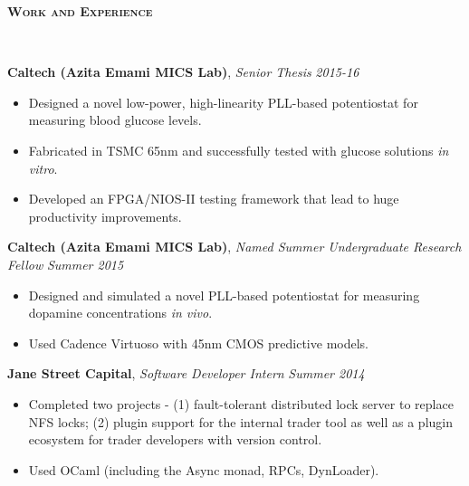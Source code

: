 \documentclass{article}
\newenvironment{changemargin}[2]{%
  \begin{list}{}{%
    \setlength{\topsep}{0pt}%
    \setlength{\leftmargin}{#1}%
    \setlength{\rightmargin}{#2}%
    \setlength{\listparindent}{\parindent}%
    \setlength{\itemindent}{\parindent}%
    \setlength{\parsep}{\parskip}%
  }%
  \item[]}{\end{list}
}
\newcommand{\lineover}{
	\begin{changemargin}{-0.05in}{-0.05in}
		\vspace*{-8pt}
		\hrulefill \\
		\vspace*{-2pt}
	\end{changemargin}
}
\newcommand{\header}[1]{
	\begin{changemargin}{-.5in}{-0.5in}
		{\large \textbf{\scshape{#1}}}\\
  	\lineover
	\end{changemargin}
}
\newenvironment{body} {
	\vspace*{-16pt}
	\begin{changemargin}{-0.25in}{-0.5in}
  }	
	{\end{changemargin}
}
\begin{document}
\smallskip


\header{Work and Experience}

\begin{body}
	\vspace{14pt}

	\textbf{Caltech (Azita Emami MICS Lab)}, \emph{Senior Thesis} \hfill \emph{2015-16}\\
	\vspace*{-4pt}
	\begin{itemize}
		\item Designed a novel low-power, high-linearity PLL-based potentiostat for measuring blood glucose levels.
		\item Fabricated in TSMC 65nm and successfully tested with glucose solutions \emph{in vitro}.
		\item Developed an FPGA/NIOS-II testing framework that lead to huge productivity improvements.
	\end{itemize}

	\smallskip

	\textbf{Caltech (Azita Emami MICS Lab)}, \emph{Named Summer Undergraduate Research Fellow} \hfill \emph{Summer 2015}\\
	\vspace*{-4pt}
	\begin{itemize}
		\item Designed and simulated a novel PLL-based potentiostat for measuring dopamine concentrations \emph{in vivo}.
		\item Used Cadence Virtuoso with 45nm CMOS predictive models. %
	\end{itemize}

	\smallskip

	\textbf{Jane Street Capital}, \emph{Software Developer Intern} \hfill \emph{Summer 2014}\\
	\vspace*{-4pt}
	\begin{itemize}
		\item Completed two projects - (1) fault-tolerant distributed lock server to replace NFS locks; (2) plugin support for the internal trader tool as well as a plugin ecosystem for trader developers with version control.
		\item Used OCaml (including the Async monad, RPCs, DynLoader).
	\end{itemize}

	\smallskip


\end{body}
\end{document}

